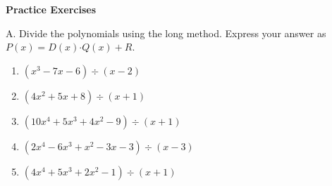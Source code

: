 \textbf{Practice Exercises}

\vspce

A. Divide the polynomials using the long method. Express your answer as  $P(x)  =D(x) \boldsymbol{\cdot} Q(x) +R$. 


\begin{enumerate}[label = \arabic*. ]

\item \hspce \hspce $(x^3-7x-6) \div (x-2)$
\vspce
\item \hspce \hspce $(4x^2+5x+8) \div (x+1)$
\vspce
\item \hspce \hspce $(10x^4+5x^3+4x^2-9) \div (x+1)$
\vspce
\item \hspce \hspce $(2x^4-6x^3+x^2-3x-3) \div (x-3)$
\vspce
\item \hspce \hspce $(4x^4+5x^3+2x^2-1) \div (x+1)$


\end{enumerate}





